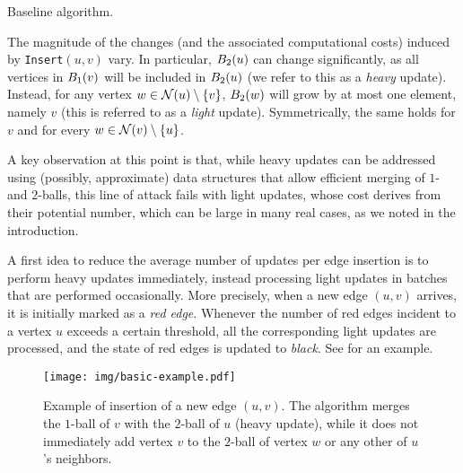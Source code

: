 \begin{algorithm}[h!]
\SetAlgoLined
\DontPrintSemicolon
\caption{Baseline algorithm.}
\label{algo:naive}
\end{algorithm}
The magnitude of the changes (and the associated computational costs) induced by \texttt{Insert}$(u, v)$ vary. In particular, $B_2(u)$ can change significantly, as all vertices in $B_1(v)$ will be included in $B_2(u)$ (we refer to this as a \emph{heavy} update). Instead, for any vertex $w \in \mathcal{N}(u)\setminus\{v\}$, $B_2(w)$ will grow by at most one element, namely $v$ (this is referred to as a \emph{light} update). 
Symmetrically, the same holds for $v$ and for every $w \in \mathcal{N}(v) \setminus \{u\}$. 

A key observation at this point is that, while heavy updates can be addressed using (possibly, approximate) data structures that allow efficient merging of $1$- and $2$-balls, this line of attack fails with light updates, whose cost derives from their potential number, which can be large in many real cases, as we noted in the introduction.

A first idea to reduce the average number of updates per edge insertion is to perform heavy updates immediately, instead processing light updates in batches that are performed occasionally. More precisely, when a new edge $(u,v)$ arrives, it is initially marked as a \emph{red edge}. Whenever the number of red edges incident to a vertex $u$ exceeds a certain threshold, all the corresponding light updates are processed, and the state of red edges is updated to \emph{black}. See  for an example. 

\begin{figure}[h]
    \centering
    \texttt{[image: img/basic-example.pdf]}
    \caption{Example of insertion of a new edge $(u,v)$. The algorithm merges the $1$-ball of $v$ with the $2$-ball of $u$ (heavy update), while it does not immediately add vertex $v$ to the $2$-ball of vertex $w$ or any other of $u$'s neighbors. 
    }
    \label{fig:basic-example}
\end{figure}

